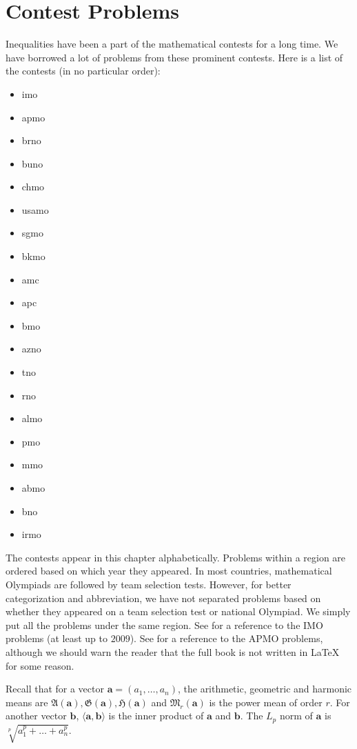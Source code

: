 \documentclass{subfile}
\begin{document}
	\chapter{Contest Problems}\label{ch:contest}
	Inequalities have been a part of the mathematical contests for a long time. We have borrowed a lot of problems from these prominent contests. Here is a list of the contests (in no particular order):
		\begin{itemize}
			\item \Gls{imo}
			\item \Gls{apmo}
			\item \Gls{brno}
			\item \Gls{buno}
			\item \Gls{chmo}
			\item \Gls{usamo}
			\item \Gls{sgmo}
			\item \Gls{bkmo}
			\item \Gls{amc}
			\item \Gls{apc}
			\item \Gls{bmo}
			\item \Gls{azno}
			\item \Gls{tno}
			\item \Gls{rno}
			\item \Gls{almo}
			\item \Gls{pmo}
			\item \Gls{mmo}
			\item \Gls{abmo}
			\item \Gls{bno}
			\item \Gls{irmo}
		\end{itemize}
	The contests appear in this chapter alphabetically. Problems within a region are ordered based on which year they appeared. In most countries, mathematical Olympiads are followed by team selection tests. However, for better categorization and abbreviation, we have not separated problems based on whether they appeared on a team selection test or national Olympiad. We simply put all the problems under the same region. See \textcite{djukicc_jankovic_matic_2011} for a reference to the IMO problems (at least up to $2009$). See \textcite{dongphd_suugaku_2009} for a reference to the APMO problems, although we should warn the reader that the full book is not written in \LaTeX{} for some reason.
	
	Recall that for a vector $\mathbf{a}=(a_{1},\ldots,a_{n})$, the arithmetic, geometric and harmonic means are $\mathfrak{A}(\mathbf{a}),\mathfrak{G}(\mathbf{a}),\mathfrak{H}(\mathbf{a})$ and $\mathfrak{M}_r(\mathbf{a})$ is the power mean of order $r$. For another vector $\mathbf{b}$, $\langle\mathbf{a},\mathbf{b}\rangle$ is the inner product of $\mathbf{a}$ and $\mathbf{b}$. The $L_{p}$ norm of $\mathbf{a}$ is $\sqrt[p]{a_{1}^{p}+\ldots+a_{n}^{p}}$.
	
\end{document}
